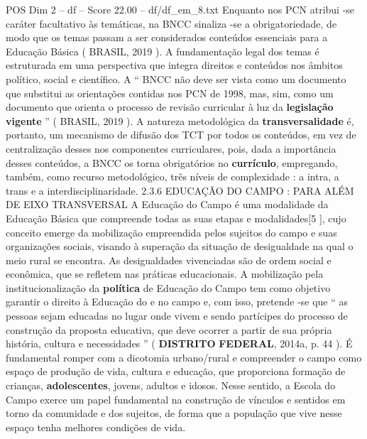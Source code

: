 \begin{textsample}{POS Dim 2 – df – Score 22.00 – df/df\_em\_8.txt}
Enquanto nos PCN atribui -se caráter facultativo às temáticas, na BNCC sinaliza -se a obrigatoriedade, de modo que os temas passam a ser considerados conteúdos essenciais para a Educação Básica ( BRASIL, 2019 ).
A fundamentação legal dos temas é estruturada em uma perspectiva que integra direitos e conteúdos nos âmbitos político, social e científico.
A “ BNCC não deve ser vista como um documento que substitui as orientações contidas nos PCN de 1998, mas, sim, como um documento que orienta o processo de revisão curricular à luz da \textbf{legislação} \textbf{vigente} ” ( BRASIL, 2019 ).
A natureza metodológica da \textbf{transversalidade} é, portanto, um mecanismo de difusão dos TCT por todos os conteúdos, em vez de centralização desses nos componentes curriculares, pois, dada a importância desses conteúdos, a BNCC os torna obrigatórios no \textbf{currículo}, empregando, também, como recurso metodológico, três níveis de complexidade : a intra, a trans e a interdisciplinaridade. 2.3.6 EDUCAÇÃO DO CAMPO : PARA ALÉM DE EIXO TRANSVERSAL A Educação do Campo é uma modalidade da Educação Básica que compreende todas as suas etapas e modalidades[5 ], cujo conceito emerge da mobilização empreendida pelos sujeitos do campo e suas organizações sociais, visando à superação da situação de desigualdade na qual o meio rural se encontra.
As desigualdades vivenciadas são de ordem social e econômica, que se refletem nas práticas educacionais.
A mobilização pela institucionalização da \textbf{política} de Educação do Campo tem como objetivo garantir o direito à Educação do e no campo e, com isso, pretende -se que “ as pessoas sejam educadas no lugar onde vivem e sendo partícipes do processo de construção da proposta educativa, que deve ocorrer a partir de sua própria história, cultura e necessidades ” ( \textbf{DISTRITO} \textbf{FEDERAL}, 2014a, p. 44 ).
É fundamental romper com a dicotomia urbano/rural e compreender o campo como espaço de produção de vida, cultura e educação, que proporciona formação de crianças, \textbf{adolescentes}, jovens, adultos e idosos.
Nesse sentido, a Escola do Campo exerce um papel fundamental na construção de vínculos e sentidos em torno da comunidade e dos sujeitos, de forma que a população que vive nesse espaço tenha melhores condições de vida.

\end{textsample}
